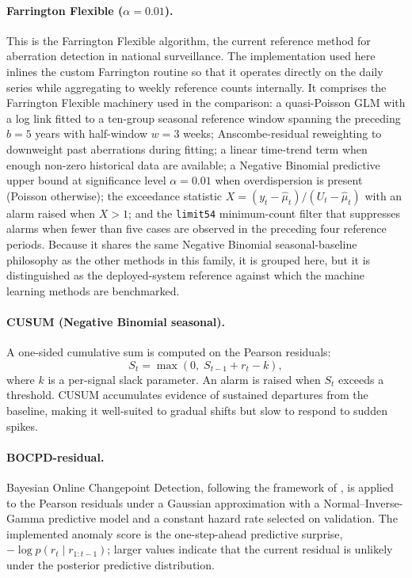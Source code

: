\documentclass[11pt]{article}
\begin{document}
\paragraph{Farrington Flexible ($\alpha = 0.01$).} This is the \citet{noufaily2013} Farrington Flexible algorithm, the current reference method for aberration detection in national surveillance. The implementation used here inlines the custom Farrington routine so that it operates directly on the daily series while aggregating to weekly reference counts internally. It comprises the Farrington Flexible machinery used in the comparison: a quasi-Poisson GLM with a log link fitted to a ten-group seasonal reference window spanning the preceding $b = 5$ years with half-window $w = 3$ weeks; Anscombe-residual reweighting to downweight past aberrations during fitting; a linear time-trend term when enough non-zero historical data are available; a Negative Binomial predictive upper bound at significance level $\alpha = 0.01$ when overdispersion is present (Poisson otherwise); the exceedance statistic $X = (y_t - \hat{\mu}_t)/(U_t - \hat{\mu}_t)$ with an alarm raised when $X > 1$; and the \texttt{limit54} minimum-count filter that suppresses alarms when fewer than five cases are observed in the preceding four reference periods. Because it shares the same Negative Binomial seasonal-baseline philosophy as the other methods in this family, it is grouped here, but it is distinguished as the deployed-system reference against which the machine learning methods are benchmarked.

\paragraph{CUSUM (Negative Binomial seasonal).} A one-sided cumulative sum is computed on the Pearson residuals:
\[
S_t = \max(0, \; S_{t-1} + r_t - k),
\]
where $k$ is a per-signal slack parameter. An alarm is raised when $S_t$ exceeds a threshold. CUSUM accumulates evidence of sustained departures from the baseline, making it well-suited to gradual shifts but slow to respond to sudden spikes.

\paragraph{BOCPD-residual.} Bayesian Online Changepoint Detection, following the framework of \citet{adams2007}, is applied to the Pearson residuals under a Gaussian approximation with a Normal--Inverse-Gamma predictive model and a constant hazard rate selected on validation. The implemented anomaly score is the one-step-ahead predictive surprise, $-\log p(r_t \mid r_{1:t-1})$; larger values indicate that the current residual is unlikely under the posterior predictive distribution.
\end{document}
